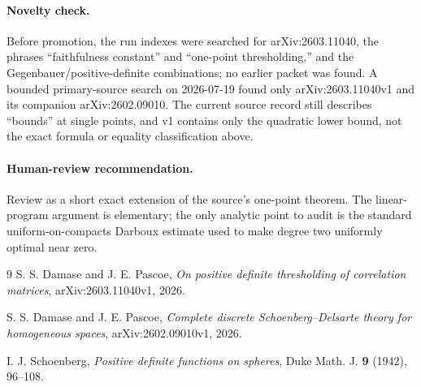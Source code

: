 \documentclass[11pt]{article}
\begin{document}
\paragraph{Novelty check.}
Before promotion, the run indexes were searched for arXiv:2603.11040, the
phrases ``faithfulness constant'' and ``one-point thresholding,'' and the
Gegenbauer/positive-definite combinations; no earlier packet was found.  A
bounded primary-source search on 2026-07-19 found only arXiv:2603.11040v1 and
its companion arXiv:2602.09010.  The current source record still describes
``bounds'' at single points, and v1 contains only the quadratic lower bound,
not the exact formula or equality classification above.

\paragraph{Human-review recommendation.}
Review as a short exact extension of the source's one-point theorem.  The
linear-program argument is elementary; the only analytic point to audit is
the standard uniform-on-compacts Darboux estimate used to make degree two
uniformly optimal near zero.

\begin{thebibliography}{9}
S. S. Damase and J. E. Pascoe,
\emph{On positive definite thresholding of correlation matrices},
arXiv:2603.11040v1, 2026.

S. S. Damase and J. E. Pascoe,
\emph{Complete discrete Schoenberg--Delsarte theory for homogeneous spaces},
arXiv:2602.09010v1, 2026.

I. J. Schoenberg,
\emph{Positive definite functions on spheres},
Duke Math. J. \textbf{9} (1942), 96--108.
\end{thebibliography}
\end{document}
